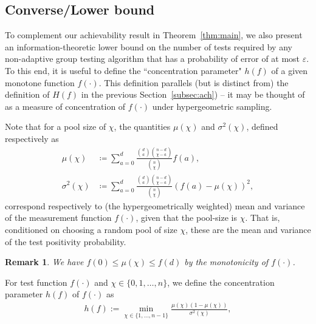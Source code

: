 \documentclass[onecolumn,letterpaper]{IEEEtran}
\DeclareMathOperator*{\argmin}{argmin}
\newtheorem{remark}{Remark}
\newenvironment{customdef}[1]
  {\renewcommand\theinnercustomdef{#1}\innercustomdef}
  {\endinnercustomdef}
\newcommand{\na}{{a}}
\newcommand{\plsize}{{\chi}}
\newcommand{\mean}{{\mu}}
\newcommand{\var}{{\sigma^{2}}}
\newcommand{\fh}{{h(f)}}
\newcommand{\fH}{{H(f)}}
\begin{document}
\subsection{Converse/Lower bound}\label{subsec:conv}
To complement our achievability result in Theorem~\ref{thm:main}, we also present an information-theoretic lower bound on the number
of tests required by any non-adaptive group testing algorithm  that has a probability of error of at most $\varepsilon$. To this end, it is useful to define the ``concentration parameter" $\fh$ of a given monotone function $f(\cdot)$. This definition parallels (but is distinct from) the definition of $\fH$ in the previous Section~\ref{subsec:ach}) -- it may be thought of as a measure of concentration of $f(\cdot)$ under hypergeometric sampling. 

Note that for a pool size of $\plsize$, the quantities $\mean(\plsize)$ and $\var(\plsize)$, defined respectively as
\begin{equation}
\label{eq:def:u_v_x}
\begin{aligned}
        \mean(\plsize) &\coloneqq \sum\limits_{\na=0}^{d} \frac{\binom{d}{\na}\binom{n-d}{\plsize-\na}}{\binom{n}{\plsize}} f(\na), \\ 
    \var(\plsize) &\coloneqq \sum\limits_{\na=0}^{d} \frac{\binom{d}{\na}\binom{n-d}{\plsize-\na}}{\binom{n}{\plsize}} (f(\na)-\mean(\plsize))^2, 
\end{aligned}
\end{equation}
\noindent correspond respectively to (the hypergeometrically weighted) mean and variance of the measurement function $f(\cdot)$, given that the pool-size is $\plsize$. That is, conditioned on choosing a random pool of size $\plsize$, these are the mean and variance of the test positivity probability.
{\begin{remark}\label{eq:mu:lb:ub:mono}
We have $f(0) \leq \mean(\plsize)\leq f(d) $ by the monotonicity of $f(\cdot)$.
\end{remark}}


\begin{customdef}{9}
For test function $f(\cdot)$ and $\plsize\in \{0,1,\dots, n\}$, we define the concentration parameter $\fh$ of $f(\cdot)$ as 
\begin{align}
\label{eq:def:concen:para}
    \fh:=\min_{\plsize\in \{1,\dots,n-1\}}\frac{\mean(\plsize)\left(1-\mean(\plsize)\right)}{\var(\plsize)},
\end{align}
\end{customdef}
\end{document}
